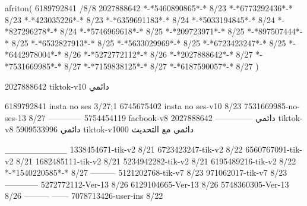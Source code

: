 afriton(
6189792841 /8/8
2027888642
*-*5460890865*-* 8/23
*-*6773292436*-* 8/23
*-*423035226*-* 8/23
*-*6359691183*-* 8/24
*-*5033194845*-* 8/24
*-*827296278*-* 8/24
*-*5746969618*-* 8/25
*-*209723971*-* 8/25
*-*897507444*-* 8/25
*-*6532827913*-* 8/25
*-*5633029969*-* 8/25
*-*6723423247*-* 8/25
*-*6442978004*-* 8/26
*-*5272772112*-* 8/26
*-*2027888642*-* 8/27
*-*7531669985*-* 8/27
*-*7159838125*-* 8/27
*-*6187590057*-* 8/27
)

2027888642 tiktok-v10
دائمي

6189792841 insta no ses
3/27;1
6745675402 insta no ses-v10
8/23
7531669985-no-ses-13
8/27
------------
5754454119 facbook-v8
دائمي
--------------
2027888642 tiktok-v8
دائمي
5909533996 tiktok-v1000
دائمي مع التحديث

__________
1338454671-tik-v2
8/21
6723423247-tik-v2
8/22
6560767091-tik-v2
8/21
1682485111-tik-v2
8/21
5234942282-tik-v2
8/21
6195489216-tik-v2
8/22
*-*1540220585*-* 8/27
---------
5121202768-tik-v7
8/23
971062017-tik-v7
8/23
------------
5272772112-Ver-13
8/26
6129104665-Ver-13
8/26
5748360305-Ver-13
8/26
---------
------
7078713426-user-ins
8/22
